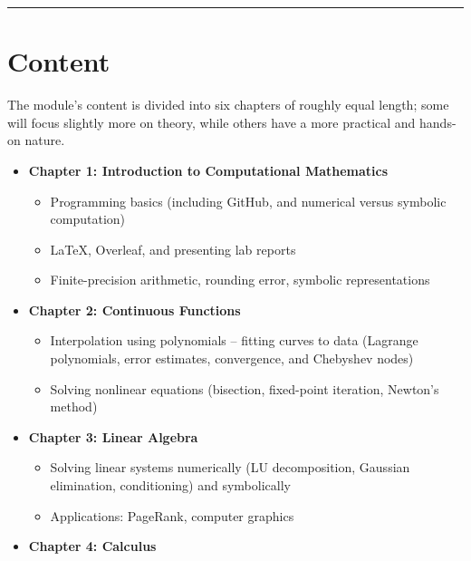 \documentclass[
  letterpaper,
  DIV=11,
  numbers=noendperiod]{scrreprt}
\providecommand{\tightlist}{%
  \setlength{\itemsep}{0pt}\setlength{\parskip}{0pt}}
\begin{document}
\begin{center}\rule{0.5\linewidth}{0.5pt}\end{center}

\section*{Content}\label{content}


The module's content is divided into six chapters of roughly equal
length; some will focus slightly more on theory, while others have a
more practical and hands-on nature.

\begin{itemize}
\tightlist
\item
  \textbf{Chapter 1: Introduction to Computational Mathematics}

  \begin{itemize}
  \tightlist
  \item
    Programming basics (including GitHub, and numerical versus symbolic
    computation)
  \item
    LaTeX, Overleaf, and presenting lab reports
  \item
    Finite-precision arithmetic, rounding error, symbolic
    representations
  \end{itemize}
\item
  \textbf{Chapter 2: Continuous Functions}

  \begin{itemize}
  \tightlist
  \item
    Interpolation using polynomials -- fitting curves to data (Lagrange
    polynomials, error estimates, convergence, and Chebyshev nodes)
  \item
    Solving nonlinear equations (bisection, fixed-point iteration,
    Newton's method)
  \end{itemize}
\item
  \textbf{Chapter 3: Linear Algebra}

  \begin{itemize}
  \tightlist
  \item
    Solving linear systems numerically (LU decomposition, Gaussian
    elimination, conditioning) and symbolically
  \item
    Applications: PageRank, computer graphics
  \end{itemize}
\item
  \textbf{Chapter 4: Calculus}


\end{itemize}
\end{document}
